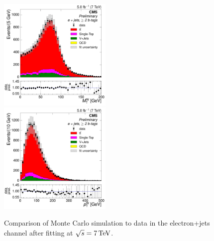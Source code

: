 \begin{figure}[hbtp]
     \includegraphics[width=0.48\textwidth]{Chapters/04_Analysis/04b_XSections/images/control_plots/after_fit/7TeV/EPlusJets_patType1CorrectedPFMet_MT_2orMoreBtags_with_ratio.pdf}\\
	 \includegraphics[width=0.48\textwidth]{Chapters/04_Analysis/04b_XSections/images/control_plots/after_fit/7TeV/EPlusJets_patType1CorrectedPFMet_WPT_2orMoreBtags_with_ratio.pdf}\hfill
	 \caption{Comparison of Monte Carlo simulation to data in the electron+jets channel after fitting at
	 $\sqrt{s}=7\,\text{Te\hspace{-.08em}V}$.}
     \label{fig:data_mc_comparison_after_fit_7TeV_electron}
\end{figure}
 
